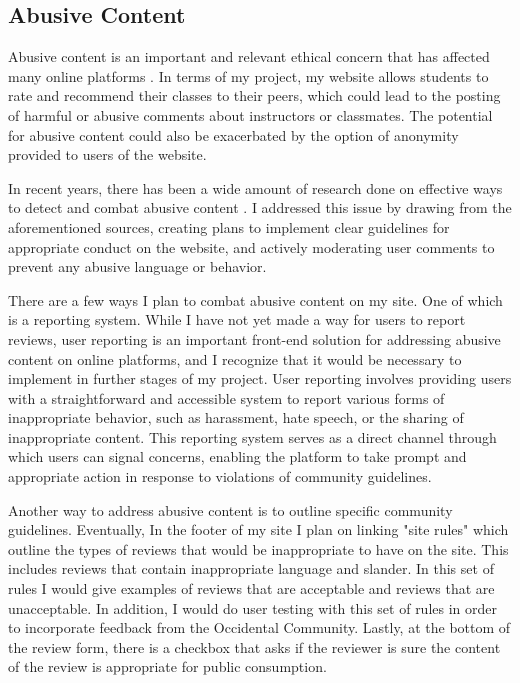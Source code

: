 \documentclass[10pt,twocolumn]{article}
\begin{document}
\subsection{Abusive Content}
Abusive content is an important and relevant ethical concern that has affected many online platforms \cite{barker19} \cite{mishra19} \cite{keller18}. In terms of my project, my website allows students to rate and recommend their classes to their peers, which could lead to the posting of harmful or abusive comments about instructors or classmates. The potential for abusive content could also be exacerbated by the option of anonymity provided to users of the website\cite{ellis1984}. 

In recent years, there has been a wide amount of research done on effective ways to detect and combat abusive content \cite{yadav15}\cite{fale22}\cite{yu16}. I  addressed this issue by drawing from the aforementioned sources, creating plans to implement clear guidelines for appropriate conduct on the website, and actively moderating user comments to prevent any abusive language or behavior. 

There are a few ways I plan to combat abusive content on my site. One of which is a reporting system. While I have not yet made a way for users to report reviews, user reporting is an important front-end solution for addressing abusive content on online platforms, and I recognize that it would be necessary to implement in further stages of my project. User reporting involves providing users with a straightforward and accessible system to report various forms of inappropriate behavior, such as harassment, hate speech, or the sharing of inappropriate content. This reporting system serves as a direct channel through which users can signal concerns, enabling the platform to take prompt and appropriate action in response to violations of community guidelines. 

Another way to address abusive content is to outline specific community guidelines. Eventually, In the footer of my site I plan on linking "site rules" which outline the types of reviews that would be inappropriate to have on the site. This includes reviews that contain inappropriate language and slander. In this set of rules I would give examples of reviews that are acceptable and reviews that are unacceptable. In addition, I would do user testing with this set of rules in order to incorporate feedback from the Occidental Community. Lastly, at the bottom of the review form, there is a checkbox that asks if the reviewer is sure the content of the review is appropriate for public consumption. 
\end{document}
